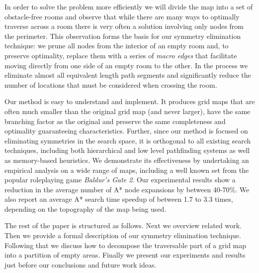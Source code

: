 In order to solve the problem more efficiently we will divide the map into a set of obstacle-free rooms and 
observe that while there are many ways to optimally traverse across a room there is very often a solution 
involving only nodes from the perimeter.
This observation forms the basis for our symmetry elimination technique: we prune all nodes from the interior
of an empty room and, to preserve optimality, replace them with a series of \emph{macro edges} that facilitate 
moving directly from one side of an empty room to the other. 
In the process we eliminate almost all equivalent length path segments and significantly reduce the number of 
locations that must be considered when crossing the room.
\par
Our method is easy to understand and implement.
It produces grid maps that are often much smaller than the original grid map
(and never larger), have the same branching factor as the original and preserve the same completeness and optimality 
guaranteeing characteristics.
Further, since our method is focused on eliminating symmetries in the search space, it is orthogonal to all existing 
search techniques, including both hierarchical and low level pathfinding systems as well as memory-based heuristics.
We demonstrate its effectiveness by undertaking an empirical analysis on a wide range of maps, 
including a well known set from the popular roleplaying game \emph{Baldur's Gate 2}. 
Our experimental results show a reduction in the average number of A* node expansions by between 40-70\%. 
We also report an average A* search time speedup of between 1.7 to 3.3 times, depending on the topography of the 
map being used.
\par
The rest of the paper is structured as follows.
Next we overview related work. Then we provide a formal description of our 
symmetry elimination technique.
Following that we discuss how to decompose the traversable part of a grid map into a partition 
of empty areas.
Finally we present our experiments and results just before our conclusions and future work ideas.



